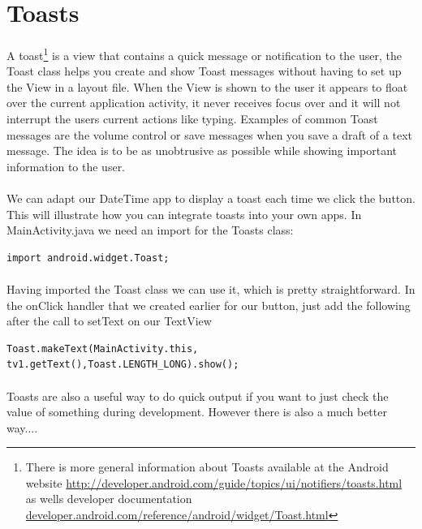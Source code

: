 \documentclass[12pt, a4paper, twoside]{book}
\begin{document}
\section{Toasts}
\paragraph{} A toast\footnote{There is more general information about Toasts available at the Android website \url{http://developer.android.com/guide/topics/ui/notifiers/toasts.html} as wells developer documentation \url{developer.android.com/reference/android/widget/Toast.html}} is a view that contains a quick message or notification to the user, the Toast class helps you create and show Toast messages without having to set up the View in a layout file. When the View is shown to the user it appears to float over the current application activity, it never receives focus over and it will not interrupt the users current actions like typing. Examples of common Toast messages are the volume control or save messages when you save a draft of a text message. The idea is to be as unobtrusive as possible while showing important information to the user.

\paragraph{} We can adapt our DateTime app to display a toast each time we click the button. This will illustrate how you can integrate toasts into your own apps. In MainActivity.java we need an import for the Toasts class:

\begin{lstlisting}
import android.widget.Toast;
\end{lstlisting}

\paragraph{} Having imported the Toast class we can use it, which is pretty straightforward. In the onClick handler that we created earlier for our button, just add the following after the call to setText on our TextView

\begin{lstlisting}
Toast.makeText(MainActivity.this, tv1.getText(),Toast.LENGTH_LONG).show();
\end{lstlisting}

\paragraph{} Toasts are also a useful way to do quick output if you want to just check the value of something during development. However there is also a much better way....
\end{document}
